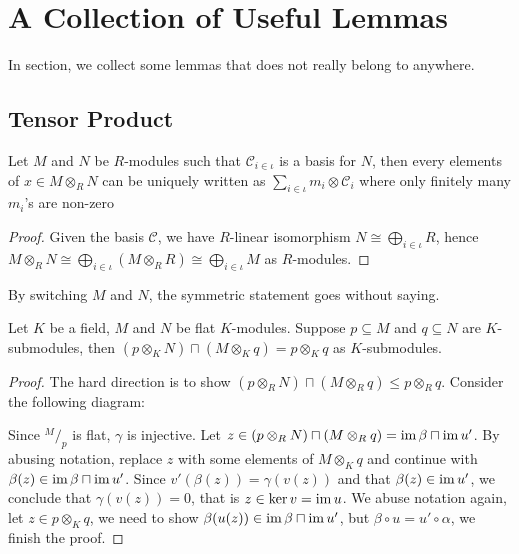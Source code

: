 \section{A Collection of Useful Lemmas}\label{sec:unclassified}

In section, we collect some lemmas that does not really belong to anywhere.

\subsection{Tensor Product}

\begin{lemma}\label{lem:expand-tensor-in-basis}
  Let $M$ and $N$ be $R$-modules such that $\mathcal{C}_{i\in\iota}$ is a basis for $N$, then every elements of $x \in M \otimes_{R} N$ can be uniquely written as $\sum_{i\in\iota}m_{i}\otimes \mathcal{C}_{i}$ where only finitely many $m_{i}$'s are non-zero
\end{lemma}

\begin{proof}
  Given the basis $\mathcal{C}$, we have $R$-linear isomorphism $N \cong\bigoplus_{i\in\iota}R$, hence $M\otimes_{R}N \cong \bigoplus_{i\in\iota}(M\otimes_{R}R)\cong\bigoplus_{i\in\iota}M$ as $R$-modules.
\end{proof}
By switching $M$ and $N$, the symmetric statement goes without saying.


\begin{lemma}

  Let $K$ be a field, $M$ and $N$ be flat $K$-modules. Suppose $p \subseteq M$ and $q \subseteq N$ are $K$-submodules, then $(p \otimes_{K} N) \sqcap (M \otimes_{K} q) = p \otimes_{K} q$ as $K$-submodules.
\end{lemma}

\begin{proof}
  The hard direction is to show $(p \otimes_{R} N) \sqcap (M \otimes_{R} q) \le p \otimes_{R} q$. Consider the following diagram:
  \begin{center}
  \end{center}
  Since $^{M}/_{p}$ is flat, $\gamma$ is injective.
  Let $z \in (p \otimes_{R} N) \sqcap (M \otimes_{R} q) = \operatorname{im} \beta \sqcap \operatorname{im} u'$. By abusing notation, replace $z$ with some elements of $M \otimes_{K} q$ and continue with $\beta(z)\in\operatorname{im} \beta \sqcap \operatorname{im} u'$. Since $v'(\beta(z))=\gamma(v(z))$ and that $\beta(z)\in \operatorname{im} u'$, we conclude that $\gamma(v(z))=0$, that is $z\in\ker v=\operatorname{im} u$. We abuse notation again, let $z \in p \otimes_{K} q$, we need to show $\beta(u(z))\in\operatorname{im} \beta \sqcap \operatorname{im} u'$, but $\beta\circ u=u'\circ\alpha$, we finish the proof.
\end{proof}

